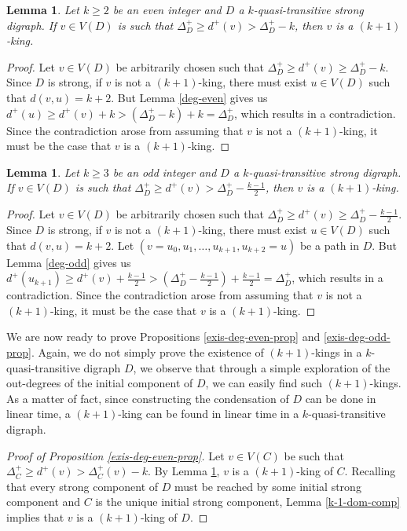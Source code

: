 \documentclass[preprint]{elsarticle}
\newtheorem{lem}[thm]{Lemma}
\begin{document}
\begin{lem} \label{exis-deg-even}
Let $k \ge 2$ be an even integer and $D$ a $k$-quasi-transitive strong digraph.   If $v \in V(D)$ is such that $\Delta^+_D \ge d^+(v) > \Delta^+_D - k$, then $v$ is a $(k+1)$-king. 
\end{lem}

\begin{proof}
Let $v \in V(D)$ be arbitrarily chosen such that $\Delta^+_D \ge d^+(v) \ge \Delta^+_D - k$.    Since $D$ is strong, if $v$ is not a $(k+1)$-king, there must exist $u \in V(D)$ such that $d(v,u) = k+2$.   But Lemma \ref{deg-even} gives us $d^+(u) \ge d^+(v) + k > (\Delta^+_D - k) + k = \Delta^+_D$, which results in a contradiction.   Since the contradiction arose from assuming that $v$ is not a $(k+1)$-king, it must be the case that $v$ is a $(k+1)$-king.
\end{proof}


\begin{lem} \label{exis-deg-odd}
Let $k \ge 3$ be an odd integer and $D$ a $k$-quasi-transitive strong digraph.   If $v \in V(D)$ is such that $\Delta^+_D \ge d^+(v) > \Delta^+_D - \frac{k-1}{2}$, then $v$ is a $(k+1)$-king. 
\end{lem}

\begin{proof}
Let $v \in V(D)$ be arbitrarily chosen such that $\Delta^+_D \ge d^+(v) \ge \Delta^+_D - \frac{k-1}{2}$.    Since $D$ is strong, if $v$ is not a $(k+1)$-king, there must exist $u \in V(D)$ such that $d(v,u) = k+2$.   Let $(v= u_0, u_1, \dots, u_{k+1}, u_{k+2} = u)$ be a path in $D$.   But Lemma \ref{deg-odd} gives us $d^+(u_{k+1}) \ge d^+(v) + \frac{k-1}{2} > (\Delta^+_D - \frac{k-1}{2}) + \frac{k-1}{2} = \Delta^+_D$, which results in a contradiction.   Since the contradiction arose from assuming that $v$ is not a $(k+1)$-king, it must be the case that $v$ is a $(k+1)$-king.
\end{proof}


We are now ready to prove Propositions \ref{exis-deg-even-prop} and \ref{exis-deg-odd-prop}.   Again, we do not simply prove the existence of $(k+1)$-kings in a $k$-quasi-transitive digraph $D$, we observe that through a simple exploration of the out-degrees of the initial component of $D$, we can easily find such $(k+1)$-kings.   As a matter of fact, since constructing the condensation of $D$ can be done in linear time, a $(k+1)$-king can be found in linear time in a $k$-quasi-transitive digraph.


\begin{proof}[Proof of Proposition \ref{exis-deg-even-prop}]
Let $v \in V(C)$ be such that $\Delta_C^+ \ge d^+ (v) > \Delta_C^+ (v) - k$.   By Lemma \ref{exis-deg-even}, $v$ is a $(k+1)$-king of $C$.   Recalling that every strong component of $D$ must be reached by some initial strong component and $C$ is the unique initial strong component, Lemma \ref{k-1-dom-comp} implies that $v$ is a $(k+1)$-king of $D$.
\end{proof}
\end{document}
